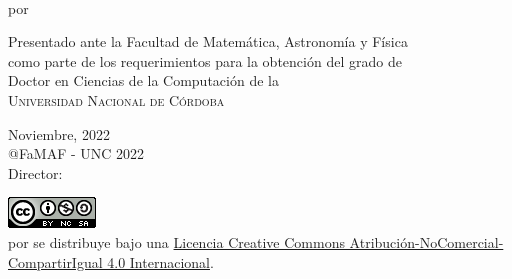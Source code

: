 \begin{titlepage}

\begin{center}
{\LARGE \ThesisTitle}\\ 
\vspace{4mm}
{\Large por \Author}\\

\vspace{50mm}

Presentado ante la Facultad de Matem\'atica, Astronom\'ia y F\'isica\\
como parte de los requerimientos para la obtenci\'on del grado de\\
Doctor en Ciencias de la Computaci\'on de la\\
\textsc{Universidad Nacional de C\'ordoba}\\
 
\vspace{50mm}

Noviembre, 2022\\
@FaMAF - UNC 2022\\
{\Large Director: \Supervisor}

\vspace{10mm}
\href{https://licensebuttons.net/l/by-nc-sa/4.0/88x31.png}{\includegraphics{images/licencia-famaf.png}}\\
{\ThesisTitle por \Author se distribuye bajo una \href{https://creativecommons.org/licenses/by-nc-sa/4.0/deed.es_ES}{Licencia Creative Commons Atribución-NoComercial-CompartirIgual 4.0 Internacional}.}
\end{center}  
\end{titlepage} 



